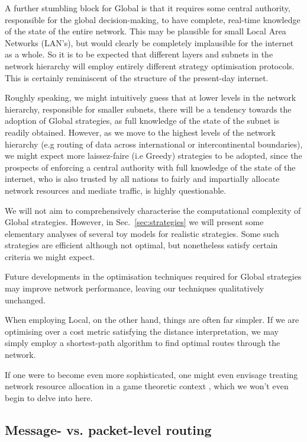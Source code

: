 \documentclass[aps,rmp,twocolumn,amsmath,amssymb,nofootinbib,superscriptaddress]{revtex4}
\begin{document}
A further stumbling block for {\sc Global} is that it requires some central authority, responsible for the global decision-making, to have complete, real-time knowledge of the state of the entire network. This may be plausible for small Local Area Networks (LAN's), but would clearly be completely implausible for the internet as a whole. So it is to be expected that different layers and subnets in the network hierarchy will employ entirely different strategy optimisation protocols. This is certainly reminiscent of the structure of the present-day internet.

Roughly speaking, we might intuitively guess that at lower levels in the network hierarchy, responsible for smaller subnets, there will be a tendency towards the adoption of {\sc Global} strategies, as full knowledge of the state of the subnet is readily obtained. However, as we move to the highest levels of the network hierarchy (e.g routing of data across international or intercontinental boundaries), we might expect more laissez-faire (i.e {\sc Greedy}) strategies to be adopted, since the prospects of enforcing a central authority with full knowledge of the state of the internet, who is also trusted by all nations to fairly and impartially allocate network resources and mediate traffic, is highly questionable.

We will not aim to comprehensively characterise the computational complexity of {\sc Global} strategies. However, in Sec.~\ref{sec:strategies} we will present some elementary analyses of several toy models for realistic strategies. Some such strategies are efficient although not optimal, but nonetheless satisfy certain criteria we might expect.

Future developments in the optimisation techniques required for {\sc Global} strategies may improve network performance, leaving our techniques qualitatively unchanged.

When employing {\sc Local}, on the other hand, things are often far simpler. If we are optimising over a cost metric satisfying the distance interpretation, we may simply employ a shortest-path algorithm to find optimal routes through the network.

If one were to become even more sophisticated, one might even envisage treating network resource allocation in a game theoretic context \cite{???}, which we won't even begin to delve into here.

%
%

\subsection{Message- vs. packet-level routing}
\end{document}
